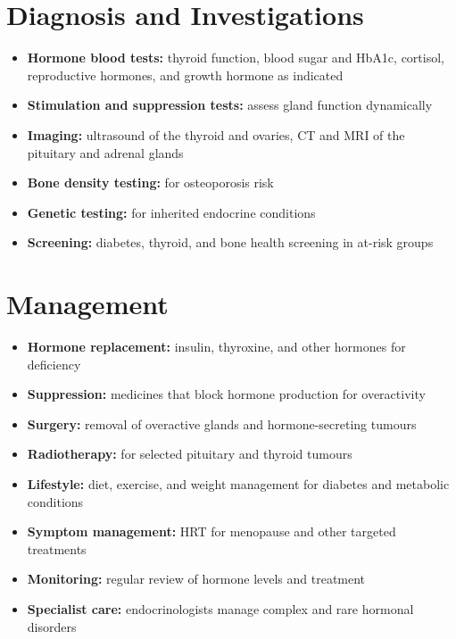 \section*{Diagnosis and Investigations}
\begin{itemize}
    \item \textbf{Hormone blood tests:} thyroid function, blood sugar and HbA1c, cortisol, reproductive hormones, and growth hormone as indicated
    \item \textbf{Stimulation and suppression tests:} assess gland function dynamically
    \item \textbf{Imaging:} ultrasound of the thyroid and ovaries, CT and MRI of the pituitary and adrenal glands
    \item \textbf{Bone density testing:} for osteoporosis risk
    \item \textbf{Genetic testing:} for inherited endocrine conditions
    \item \textbf{Screening:} diabetes, thyroid, and bone health screening in at-risk groups
\end{itemize}

\section*{Management}
\begin{itemize}
    \item \textbf{Hormone replacement:} insulin, thyroxine, and other hormones for deficiency
    \item \textbf{Suppression:} medicines that block hormone production for overactivity
    \item \textbf{Surgery:} removal of overactive glands and hormone-secreting tumours
    \item \textbf{Radiotherapy:} for selected pituitary and thyroid tumours
    \item \textbf{Lifestyle:} diet, exercise, and weight management for diabetes and metabolic conditions
    \item \textbf{Symptom management:} HRT for menopause and other targeted treatments
    \item \textbf{Monitoring:} regular review of hormone levels and treatment
    \item \textbf{Specialist care:} endocrinologists manage complex and rare hormonal disorders
\end{itemize}

